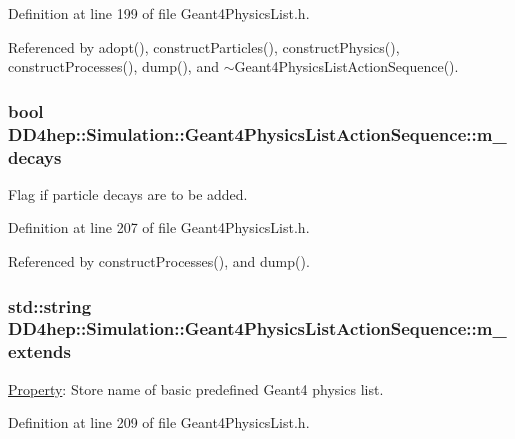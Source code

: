 Definition at line 199 of file Geant4PhysicsList.h.

Referenced by adopt(), constructParticles(), constructPhysics(), constructProcesses(), dump(), and $\sim$Geant4PhysicsListActionSequence().\hypertarget{class_d_d4hep_1_1_simulation_1_1_geant4_physics_list_action_sequence_a92b7972cbc8ee15f7213d68609121b4e}{
\subsubsection[{m\_\-decays}]{\setlength{\rightskip}{0pt plus 5cm}bool {\bf DD4hep::Simulation::Geant4PhysicsListActionSequence::m\_\-decays}}}
\label{class_d_d4hep_1_1_simulation_1_1_geant4_physics_list_action_sequence_a92b7972cbc8ee15f7213d68609121b4e}


Flag if particle decays are to be added. 

Definition at line 207 of file Geant4PhysicsList.h.

Referenced by constructProcesses(), and dump().\hypertarget{class_d_d4hep_1_1_simulation_1_1_geant4_physics_list_action_sequence_a0231a66223374c98dd4d0763893e8cad}{
\subsubsection[{m\_\-extends}]{\setlength{\rightskip}{0pt plus 5cm}std::string {\bf DD4hep::Simulation::Geant4PhysicsListActionSequence::m\_\-extends}}}
\label{class_d_d4hep_1_1_simulation_1_1_geant4_physics_list_action_sequence_a0231a66223374c98dd4d0763893e8cad}


\hyperlink{class_d_d4hep_1_1_property}{Property}: Store name of basic predefined Geant4 physics list. 

Definition at line 209 of file Geant4PhysicsList.h.

